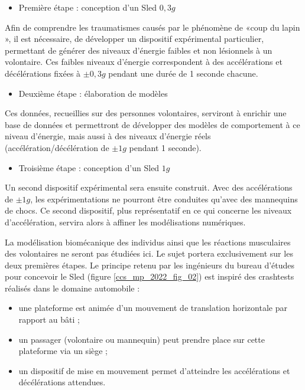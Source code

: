 \begin{itemize}
  \item Première étape : conception d'un Sled $0,3 g$
\end{itemize}

Afin de comprendre les traumatismes causés par le phénomène de «coup du lapin », il est nécessaire, de développer un dispositif expérimental particulier, permettant de générer des niveaux d'énergie faibles et non lésionnels à un volontaire. Ces faibles niveaux d'énergie correspondent à des accélérations et décélérations fixées à $\pm 0,3 g$ pendant une durée de 1 seconde chacune.

\begin{itemize}
  \item Deuxième étape : élaboration de modèles
\end{itemize}

Ces données, recueillies sur des personnes volontaires, serviront à enrichir une base de données et permettront de développer des modèles de comportement à ce niveau d'énergie, mais aussi à des niveaux d'énergie réels (accélération/décélération de $\pm 1 g$ pendant 1 seconde).

\begin{itemize}
  \item Troisième étape : conception d'un Sled $1 g$
\end{itemize}

Un second dispositif expérimental sera ensuite construit. Avec des accélérations de $\pm 1 g$, les expérimentations ne pourront être conduites qu'avec des mannequins de chocs. Ce second dispositif, plus représentatif en ce qui concerne les niveaux d'accélération, servira alors à affiner les modélisations numériques.

La modélisation biomécanique des individus ainsi que les réactions musculaires des volontaires ne seront pas étudiées ici. Le sujet portera exclusivement sur les deux premières étapes.
Le principe retenu par les ingénieurs du bureau d'études pour concevoir le Sled (figure \ref{ccs_mp_2022_fig_02}) est inspiré des crashtests réalisés dans le domaine automobile :

\begin{itemize}
  \item une plateforme est animée d'un mouvement de translation horizontale par rapport au bâti ;
  \item un passager (volontaire ou mannequin) peut prendre place sur cette plateforme via un siège ;
  \item un dispositif de mise en mouvement permet d'atteindre les accélérations et décélérations attendues.
\end{itemize}


